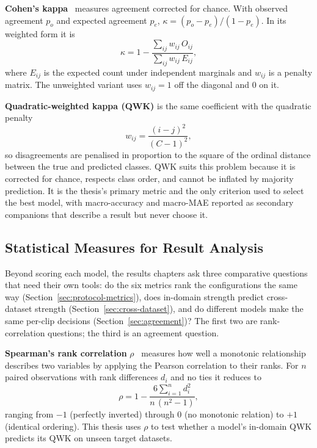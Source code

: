 \documentclass[../main.tex]{subfiles}
\begin{document}
\textbf{Cohen's kappa}~\cite{cohenkappa} measures agreement corrected for chance. With observed agreement $p_o$ and expected agreement $p_e$, $\kappa=(p_o-p_e)/(1-p_e)$. In its weighted form it is
\begin{equation}
\kappa = 1 - \frac{\sum_{ij} w_{ij}\,O_{ij}}{\sum_{ij} w_{ij}\,E_{ij}},
\end{equation}
where $E_{ij}$ is the expected count under independent marginals and $w_{ij}$ is a penalty matrix. The unweighted variant uses $w_{ij}=1$ off the diagonal and $0$ on it.

\textbf{Quadratic-weighted kappa (QWK)} is the same coefficient with the quadratic penalty
\begin{equation}
w_{ij} = \frac{(i-j)^2}{(C-1)^2},
\label{eq:qwk}
\end{equation}
so disagreements are penalised in proportion to the square of the ordinal distance between the true and predicted classes. QWK suits this problem because it is corrected for chance, respects class order, and cannot be inflated by majority prediction. It is the thesis's primary metric and the only criterion used to select the best model, with macro-accuracy and macro-MAE reported as secondary companions that describe a result but never choose it.

\FloatBarrier
\subsection{Statistical Measures for Result Analysis}
\label{sec:stats-lit}

Beyond scoring each model, the results chapters ask three comparative questions that need their own tools: do the six metrics rank the configurations the same way (Section~\ref{sec:protocol-metrics}), does in-domain strength predict cross-dataset strength (Section~\ref{sec:cross-dataset}), and do different models make the same per-clip decisions (Section~\ref{sec:agreement})? The first two are rank-correlation questions; the third is an agreement question.

\textbf{Spearman's rank correlation} $\rho$~\cite{spearman} measures how well a monotonic relationship describes two variables by applying the Pearson correlation to their ranks. For $n$ paired observations with rank differences $d_i$ and no ties it reduces to
\begin{equation}
\rho = 1 - \frac{6\sum_{i=1}^{n} d_i^{2}}{n\,(n^{2}-1)},
\end{equation}
ranging from $-1$ (perfectly inverted) through $0$ (no monotonic relation) to $+1$ (identical ordering). This thesis uses $\rho$ to test whether a model's in-domain QWK predicts its QWK on unseen target datasets.
\end{document}
